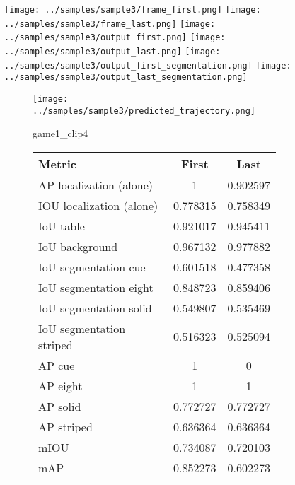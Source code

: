\begin{figure}
    \texttt{[image: ../samples/sample3/frame\_first.png]}
    \texttt{[image: ../samples/sample3/frame\_last.png]}
    \newline
    \texttt{[image: ../samples/sample3/output\_first.png]}
    \texttt{[image: ../samples/sample3/output\_last.png]}
    \newline
    \texttt{[image: ../samples/sample3/output\_first\_segmentation.png]}
    \texttt{[image: ../samples/sample3/output\_last\_segmentation.png]}
    \newline
    \begin{subfigure}[b]{0.49\textwidth}
        \vspace{20pt}
        \texttt{[image: ../samples/sample3/predicted\_trajectory.png]}
        \caption*{game1\_clip4}
    \end{subfigure}
\begin{subfigure}[b]{0.49\textwidth}
    \begin{tabular}{|l|c|c|}
        \hline
        \textbf{Metric} & \textbf{First} & \textbf{Last} \\
        \hline
        AP localization (alone) & 1 & 0.902597 \\ 
        IOU localization (alone) & 0.778315 & 0.758349 \\ 
        \hline
        IoU table & 0.921017 & 0.945411 \\ 
        IoU background & 0.967132 & 0.977882 \\ 
        \hline
        IoU segmentation cue & 0.601518 & 0.477358 \\ 
        IoU segmentation eight & 0.848723 & 0.859406 \\ 
        IoU segmentation solid & 0.549807 & 0.535469 \\ 
        IoU segmentation striped & 0.516323 & 0.525094 \\ 
        \hline
        AP cue & 1 & 0 \\ 
        AP eight & 1 & 1 \\ 
        AP solid & 0.772727 & 0.772727 \\ 
        AP striped & 0.636364 & 0.636364 \\ 
        \hline
        mIOU & 0.734087 & 0.720103 \\ 
        mAP & 0.852273 & 0.602273 \\ 
        \hline
    \end{tabular}    
\end{subfigure}
\end{figure}

